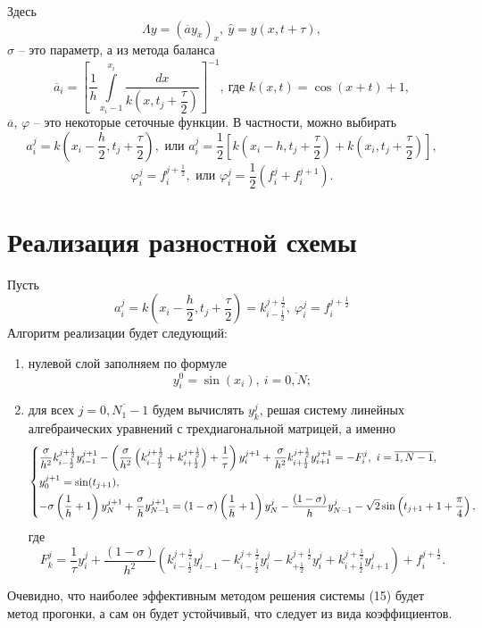 \documentclass[a4paper, 12pt]{article}
\begin{document}
Здесь $$\Lambda y = (\overline a y_{\overline x})_{x},\ \hat y = y(x, t+\tau),$$
$\sigma$ -- это параметр, а из метода баланса
$$\overline a_i = \left[\dfrac 1 h \int\limits_{x_i-1}^{x_i}\dfrac{d x}{k\left(x, t_j+\dfrac \tau 2\right)}\right]^{-1},\ \text{где } k(x,t) = \cos(x+t)+1,$$
$\overline a$, $\varphi$ -- это некоторые сеточные функции. В частности, можно выбирать
$$a_i^j = k\left(x_i - \dfrac h 2, t_j + \dfrac \tau 2\right), \text{ или } a_i^j = \dfrac 12 \left[k\left(x_i - h, t_j + \dfrac \tau2\right) + k \left(x_i, t_j + \dfrac \tau2\right)\right],$$
$$\varphi_i^j = f_i^{j+\frac 12}, \text { или } \varphi_i^j = \dfrac 12(f_i^j + f_i^{j+1}).$$
\section*{Реализация разностной схемы}
Пусть $$a_i^j = k\left(x_i - \dfrac h 2, t_j + \dfrac \tau 2\right) = k_{i-\frac 12}^{j + \frac 12},\ \varphi_i^j = f_i^{j + \frac 12}$$
Алгоритм реализации будет следующий:
\begin{enumerate}
	\item нулевой слой заполняем по формуле \begin{equation}
		y_i^0 = \sin(x_i),\ i = \overline {0,N};
	\end{equation}
	\item для всех $j = \overline {0, N_1-1}$ будем вычислять $y_k^j$, решая систему линейных алгебраических уравнений с трехдиагональной матрицей, а именно
	\begin{equation}
		\begin{dcases}
			\dfrac{\sigma}{h^2}k_{i-\frac 12}^{j+\frac 12}y_{i-1}^{j+1} - \left(\dfrac{\sigma}{h^2}\left(k_{i-\frac 12}^{j + \frac 12} + k_{i + \frac 12}^{j + \frac 12}\right) + \dfrac 1 \tau\right) y_i^{j+1} + \dfrac {\sigma}{h^2}k_{i+\frac 12}^{j+\frac 12} y_{i+1}^{j+1} = - F_i^j,\ i = \overline {1, N-1},\\
			y_0^{j+1} = \sin (t_{j+1}),\\ 
			-\sigma \left(\dfrac 1 h + 1\right) y_N^{j+1} + \dfrac \sigma h y_{N-1}^{j+1} = (1-\sigma)\left(\dfrac 1 h + 1\right)y_N^j - \dfrac{(1-\sigma)}{h}y_{N-1}^j -\sqrt 2\sin\left(t_{j+1} + 1 + \dfrac \pi 4\right),
		\end{dcases}
	\end{equation}
	где $$F_k^j = \dfrac 1 \tau y_i^j + \dfrac{(1-\sigma)}{h^2}(k_{i-\frac 12}^{j+\frac 12} y_{i-1}^j - k_{i-\frac 12}^{j+\frac 12} y_i^j- k_{+\frac 12}^{j+\frac 12} y_i^j + k_{i+\frac12}^{j+\frac12}y_{i+1}^j) + f_i^{j+\frac 12}.$$
\end{enumerate}
Очевидно, что наиболее эффективным методом решения системы (15) будет метод прогонки, а сам он будет устойчивый, что следует из вида коэффициентов.
\end{document}
